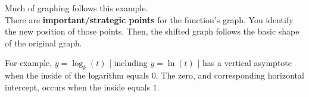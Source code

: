 \documentclass{ximera}
\begin{document}
\begin{example}
\begin{image}
\end{image}








\end{example}


Much of graphing follows this example.  \\


There are \textbf{important/strategic points} for the function's graph. You identify the new position of those points.  Then, the shifted graph follows the basic shape of the original graph.






For example, $y = \log_k(t)$ [ including $y = \ln(t)$ ] has a vertical asymptote when the inside of the logarithm equals $0$. The zero, and corresponding horizontal intercept, occurs when the inside equals $1$.  
\end{document}

